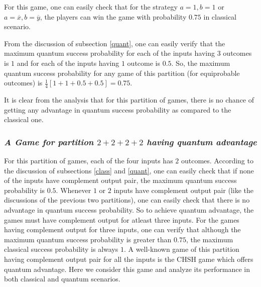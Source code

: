 \documentclass[]{svjour3}
\begin{document}
For this game, one can easily check that for the strategy $a=1, b=1$ or $a=\overline{x}, b=\overline{y}$, the players can win the game with probability $0.75$ in classical scenario. 

From the discussion of subsection \ref{quant}, one can easily verify that the maximum quantum success probability for each of the inputs having $3$ outcomes is $1$ and for each of the inputs having $1$ outcome is $0.5$. So, the maximum quantum success probability for any game of this partition (for equiprobable outcomes) is  $\frac{1}{4}[1+1+0.5+0.5] = 0.75$.

It is clear from the analysis that for this partition of games, there is no chance of getting any advantage in quantum success probability as compared to the classical one.\\



\subsubsection{\it A Game for partition $2+2+2+2$ having quantum advantage}
\label{parchsh}

For this partition of games, each of the four inputs has $2$ outcomes. According to the discussion of subsections \ref{class} and \ref{quant}, one can easily check that if none of the inputs have complement output pair, the maximum quantum success probability is $0.5$. Whenever $1$ or $2$ inputs have complement output pair (like the discussions of the previous two partitions), one can easily check that there is no advantage in quantum success probability. So to achieve quantum advantage, the games must have complement output for atleast three inputs. For the games having complement output for three inputs, one can verify that although the maximum quantum success probability is greater than $0.75$, the maximum classical success probability is always $1$. A well-known game of this partition having complement output pair for all the inputs is the CHSH game which offers quantum advantage. Here we consider this game and analyze its performance in both classical and quantum scenarios.
\end{document}
